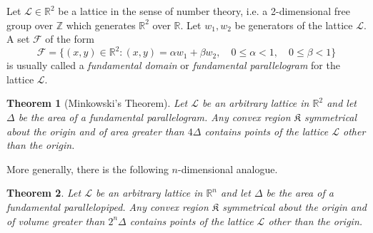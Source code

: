 \documentclass[12pt]{article}
\newtheorem{thm}{Theorem}
\begin{document}
Let $\mathcal{L} \in \mathbb{R}^2$ be a lattice in the sense of
number theory, i.e. a 2-dimensional free group over ${\mathbb{Z}}$
which generates $\mathbb{R}^2$ over $\mathbb{R}$. Let $w_1,w_2$ be
generators of the lattice $\mathcal{L}$. A set $\mathcal{F}$ of
the form
$$\mathcal{F}=\{(x,y)\in\mathbb{R}^2: (x,y)=\alpha w_1+\beta w_2,\quad 0\leq \alpha < 1,\quad 0\leq \beta <1 \}$$
is usually called a \emph{fundamental domain} or \emph{fundamental parallelogram} for the lattice $\mathcal{L}$.

\begin{thm}[Minkowski's Theorem]
Let $\mathcal{L}$ be an arbitrary lattice in $\mathbb{R}^2$ and
let $\Delta$ be the area of a fundamental parallelogram. Any
convex region $\mathfrak{K}$ symmetrical about the origin and of
area greater than $4\Delta$ contains points of the lattice
$\mathcal{L}$ other than the origin.
\end{thm}

More generally, there is the following $n$-dimensional analogue.

\begin{thm}
Let $\mathcal{L}$ be an arbitrary lattice in $\mathbb{R}^n$ and
let $\Delta$ be the area of a fundamental parallelopiped. Any
convex region $\mathfrak{K}$ symmetrical about the origin and of
volume greater than $2^n\Delta$ contains points of the lattice
$\mathcal{L}$ other than the origin.
\end{thm}
\end{document}
